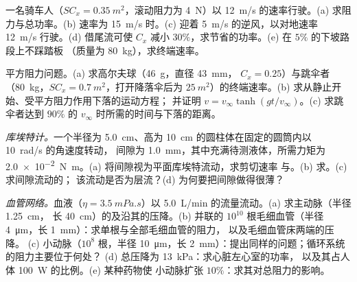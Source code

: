 \begin{exercise}[$\star\star$]\label{exo:b2:viscous-flows:7}
一名骑车人（$SC_x = \qty{0.35}{m^2}$，滚动阻力为 \qty{4}{N}）以 
\qty{12}{m/s} 的速率行驶。(a) 求阻力与总功率。(b) 速率为 \qty{15}{m/s} 时。(c) 迎着 
\qty{5}{m/s} 的逆风，以对地速率 \qty{12}{m/s} 行驶。(d) 借尾流可使 
$C_x$ 减小 $30\%$，求节省的功率。(e) 在 $5\%$ 的下坡路段上不踩踏板
（质量为 \qty{80}{kg}），求终端速率。
\end{exercise}

\begin{exercise}[$\star\star$]\label{exo:b2:viscous-flows:8}
平方阻力问题。(a) 求高尔夫球（\qty{46}{g}，直径 \qty{43}{mm}，
$C_x = 0.25$）与跳伞者（\qty{80}{kg}，$SC_x = \qty{0.7}{m^2}$，打开降落伞后为 
$\qty{25}{m^2}$）的终端速率。(b) 求从静止开始、受平方阻力作用下落的运动方程；
并证明 $v = v_\infty\tanh(gt/v_\infty)$。(c) 求跳伞者达到 
$90\%$ 的 $v_\infty$ 时所需的时间与下落的距离。
\end{exercise}

\begin{exercise}[$\star\star$]\label{exo:b2:viscous-flows:9}
\emph{库埃特计。}一个半径为 \qty{5.0}{cm}、高为 
\qty{10}{cm} 的圆柱体在固定的圆筒内以 \qty{10}{rad/s} 的角速度转动，
间隙为 \qty{1.0}{mm}，其中充满待测液体，所需力矩为 
\qty{2.0e-2}{N.m}。(a) 将间隙视为平面库埃特流动，求剪切速率
与。(b) 求。(c) 求间隙流动的；
该流动是否为层流？(d) 为何要把间隙做得很薄？
\end{exercise}

\begin{exercise}[$\star\star\star$]\label{exo:b2:viscous-flows:10}
\emph{血管网络。}血液（$\eta = \qty{3.5}{mPa.s}$）以 
\qty{5.0}{L/min} 的流量流动。(a) 求主动脉（半径 \qty{1.25}{cm}，
长 \qty{40}{cm}）的及沿其的压降。(b) 并联的 $10^{10}$ 
根毛细血管（半径 \qty{4}{\micro m}，长 \qty{1}{mm}）：求单根与全部毛细血管的阻力，
以及毛细血管床两端的压降。
(c) 小动脉（$10^8$ 根，半径 \qty{10}{\micro m}，长 
\qty{2}{mm}）：提出同样的问题；循环系统的阻力主要位于何处？
(d) 总压降为 \qty{13}{kPa}：求心脏左心室的功率，
以及其占人体 \qty{100}{W} 的比例。(e) 某种药物使
小动脉扩张 $10\%$：求其对总阻力的影响。
\end{exercise}

